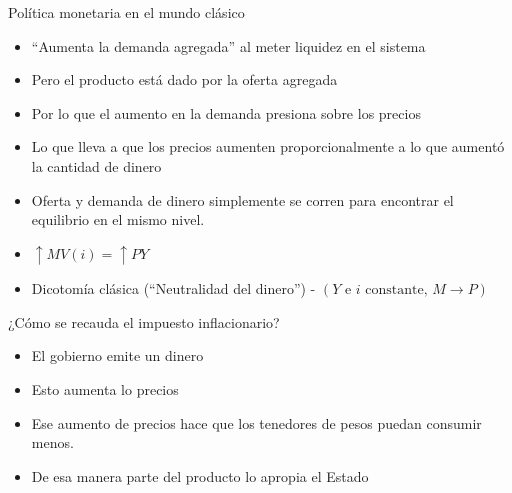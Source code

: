 \documentclass{beamer}
\begin{document}

\begin{frame}{Política monetaria en el mundo clásico}
\begin{itemize}
    \item “Aumenta la demanda agregada” al meter liquidez en el sistema 
    \item Pero el producto está dado por la oferta agregada
    \item Por lo que el aumento en la demanda presiona sobre los precios
    \item Lo que lleva a que los precios aumenten proporcionalmente a lo que aumentó la cantidad de dinero
    \item Oferta y demanda de dinero simplemente se corren para encontrar el equilibrio en el mismo nivel.
    \item $\uparrow M V(i)=\uparrow P Y$ 
    \item Dicotomía clásica (“Neutralidad del dinero”) - $(Y \text { e } i \text { constante, } M \rightarrow P)$
    \end{itemize}
 

\end{frame}


\begin{frame}{¿Cómo se recauda el impuesto inflacionario?}

    \begin{itemize}
        \item El gobierno emite un dinero
        \item Esto aumenta lo precios
        \item Ese aumento de precios hace que los tenedores de pesos puedan consumir menos.
        \item De esa manera parte del producto lo apropia el Estado
    \end{itemize}
    
\end{frame}

\end{document}
